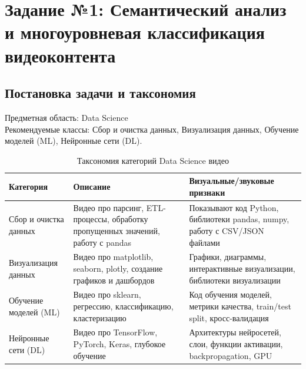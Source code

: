 \documentclass[oneside,a4paper,14pt]{extarticle}
\begin{document}
\section{Задание №1: Семантический анализ и многоуровневая классификация видеоконтента}
\subsection{Постановка задачи и таксономия}
\noindent
Предметная область: Data Science\\
Рекомендуемые классы: Сбор и очистка данных, Визуализация данных, Обучение моделей (ML), Нейронные сети (DL).
\begin{table}[H]
\centering
\caption{Таксономия категорий Data Science видео}
\begin{tabular}{|p{3cm}|p{6cm}|p{6cm}|}
\hline
\textbf{Категория} & \textbf{Описание} & \textbf{Визуальные/звуковые признаки} \\ \hline
Сбор и очистка данных & Видео про парсинг, ETL-процессы, обработку пропущенных значений, работу с pandas & Показывают код Python, библиотеки pandas, numpy, работу с CSV/JSON файлами \\ \hline
Визуализация данных & Видео про matplotlib, seaborn, plotly, создание графиков и дашбордов & Графики, диаграммы, интерактивные визуализации, библиотеки визуализации \\ \hline
Обучение моделей (ML) & Видео про sklearn, регрессию, классификацию, кластеризацию & Код обучения моделей, метрики качества, train/test split, кросс-валидация \\ \hline
Нейронные сети (DL) & Видео про TensorFlow, PyTorch, Keras, глубокое обучение & Архитектуры нейросетей, слои, функции активации, backpropagation, GPU \\ \hline
\end{tabular}
\end{table}

\newpage
\end{document}
